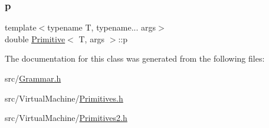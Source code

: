 \mbox{\label{struct_primitive_a43fac47ebf8ec63a70443d80dcd04687}} 
\subsubsection{\texorpdfstring{p}{p}}
{\footnotesize\ttfamily template$<$typename T, typename... args$>$ \\
double \hyperlink{struct_primitive}{Primitive}$<$ T, args $>$\+::p}



The documentation for this class was generated from the following files\+:\begin{DoxyCompactItemize}
\item 
src/\hyperlink{_grammar_8h}{Grammar.\+h}\item 
src/\+Virtual\+Machine/\hyperlink{_primitives_8h}{Primitives.\+h}\item 
src/\+Virtual\+Machine/\hyperlink{_primitives2_8h}{Primitives2.\+h}\end{DoxyCompactItemize}
